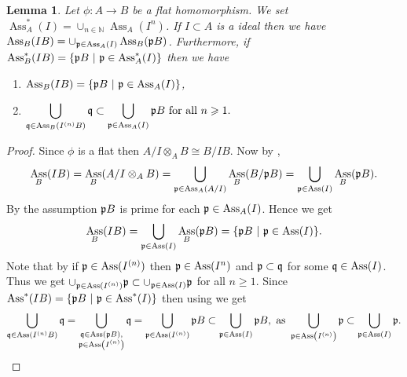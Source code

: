 \documentclass[12pt]{amsart}
\numberwithin{equation}{section}
\newtheorem{lemma}[theorem]{Lemma}
\theoremstyle{definition}
\DeclareMathOperator{\Ass}{Ass}
\newcommand{\NN}{{\mathbb N}}
\def\I{{\mathcal I}}
\def\pp{{\frak p}}
\def\qq{{\frak q}}
\begin{document}
\begin{lemma}\label{proposition: associated primes of symbolic powers}
	Let $\phi: A\to B$ be a flat homomorphism. We set $\Ass_A^*(I)=\cup_{n\in \NN}\Ass_A(I^n)$.  If $I\subset A$ is a ideal then we have $\Ass_B(IB)=\cup_{\pp \in \Ass_A(I)} \Ass_B(\pp B) $. Furthermore, if $ \Ass_B^*(IB)=\{\pp B ~|~ \pp \in \Ass_A^*(I)
	\}$ then we have 
	\begin{enumerate}
\item $\Ass_B(IB)=\{\pp B~|~ \pp \in \Ass_A(I) \}$,
\item $\displaystyle \bigcup_{\qq\in\Ass_B(I^{(n)}B)}\qq \subset\bigcup_{\pp\in\Ass_A(I)}\pp B \text{ for all } n \geqslant 1.$ 
	\end{enumerate}
\end{lemma}
\begin{proof}
	Since  $\phi$ is a flat  then $A/I \otimes_A B \cong B/IB $. Now  by , 
$$ \Ass_B(IB)=	\Ass_B (A/I\otimes_A B) = \bigcup_{\mathfrak{p} \in \Ass_A(A/I)} \Ass_B (B /\mathfrak{p}B)=\bigcup_{\pp \in \Ass(I)}\Ass_B(\pp B).$$
By the assumption $\pp B $ is prime for each $\pp \in \Ass_A(I)$. Hence we get  
 $$\Ass_B(IB) = \bigcup_{\pp \in \Ass(I)}\Ass_B(\pp B)=\{\pp B~|~ \pp \in \Ass(I) \}.$$
Note that by \cite[Lemma 2.2]{ha2023binomial} if $\pp \in \Ass(I^{(n)})$ then $\pp \in \Ass(I^n) $ and  $\pp \subset \qq $ for some $\qq\in \Ass(I)$. Thus we get $\displaystyle \cup_{\pp\in \Ass(I^{(n)})} \pp \subset \cup_{\pp\in \Ass(I)} \pp $ for all $n \geqslant 1$. Since $ \Ass^*(IB)=\{\pp B ~|~ \pp \in \Ass^*(I) \}$ then using  we get 
$$ \bigcup_{\qq\in\Ass(I^{(n)}B)}\qq = \bigcup_{\substack{\qq\in \Ass(\pp B),\\\pp \in \Ass\left(I^{(n)} \right) }}\qq = \bigcup_{\pp \in \Ass(I^{(n)})} \pp B  \subset \bigcup_{\pp\in\Ass(I)}\pp B, \text{ as } \bigcup_{\pp \in \Ass\left( I^{(n)} \right)} \pp  \subset \bigcup _{\pp \in \Ass(I)} \pp. $$

	\end{proof}

\end{document}
